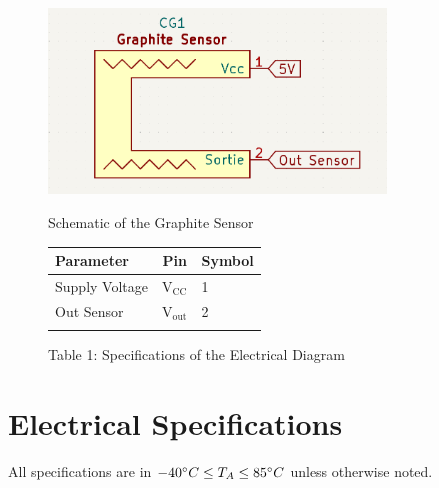 \documentclass[10pt]{datasheet}
\begin{document}
\begin{figure}[h!]
    \begin{minipage}[ts]{.47\linewidth}
        \centering
        \captionsetup{justification=centering}
        \includegraphics[width=0.8\textwidth]{Cover/ElectricDiagramSensor.png}
        \caption{\small{Schematic of the Graphite Sensor}}
    \end{minipage}
    \begin{minipage}[b]{.45\linewidth}
        \centering
        \caption*{Table 1: Specifications of the Electrical Diagram}
            \begin{tabularx}{\textwidth}{l | c | X}
                \thickhline
                \textbf{Parameter} & \textbf{Pin} & \textbf{Symbol} \\
                \hline
                Supply Voltage & V$_{\text{CC}}$ & 1 \\ 
                \hline
                Out Sensor & V$_{\text{out}}$ & 2 \\
                \thickhline
            \end{tabularx}
    \end{minipage}
\end{figure}

\setcounter{table}{1}

\section{Electrical Specifications}
All specifications are in $-40\degree C \leq T_A \leq 85\degree C$ unless otherwise noted.
\end{document}
